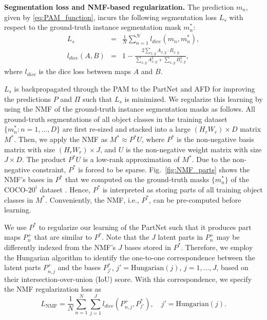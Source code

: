 \documentclass[final]{cvpr}
\begin{document}
{\bf Segmentation loss and NMF-based regularization.}
The prediction $m_n$, given by \eqref{eq:PAM_function}, incurs the following segmentation loss $L_{s}$ with respect to the ground-truth instance segmentation mask $m_n^*$: %
\begin{equation}
\begin{array}{rcl}
    L_{s} &=& \displaystyle \frac{1}{N} \sum_{n=1}^N l_{dice}(m_n, m^*_n),
    \\
    l_{dice}(A,B) &=& 1 - \frac{2 \sum_{x, y}A_{x, y} \cdot B_{x, y}}{\sum_{x, y} A_{x, y}^{2}+\sum_{x, y} B_{x, y}^{2}},
\end{array} 
    \label{eq:mask_loss}
\end{equation}
where $l_{dice}$ is the  dice loss \cite{milletari2016v} between maps $A$ and $B$. 

$L_{s}$ is backpropagated through the PAM to the PartNet and AFD for improving the predictions $P$ and $\Pi$ such that $L_{s}$ is minimized. We regularize this learning by using the NMF of the ground-truth instance segmentation masks as follows.  All ground-truth segmentations of all object classes in the training dataset $\{m_n^*:n=1,\dots,D\}$ are first re-sized and stacked into a large $(H_r W_r) \times D$ matrix $M^*$. Then, we apply the NMF as $M^* \approx P^*U$, where $P^*$ is the non-negative basis matrix with size $(H_r W_r) \times J$, and $U$ is the non-negative weight matrix with size $J \times D$. The product $P^*U$ is a low-rank approximation of $M^*$.
Due to the non-negative constraint, $P^*$ is forced to be sparse. Fig.~\ref{fig:NMF_parts} shows the NMF's bases in $P^*$ that we computed on the ground-truth masks $\{m_n^*\}$ of the COCO-$20^i$ dataset \cite{michaelis2018one}. Hence, $P^*$ is interpreted as storing parts  of all training object classes in $M^*$. Conveniently, the NMF, i.e., $P^*$, can be pre-computed before learning.

We use $P^*$ to regularize our learning of the PartNet such that it produces part maps $P^+_n$ that are similar to $P^*$. Note that the $J$ latent parts in $P^+_n$ may be differently indexed from the NMF's $J$ bases stored in $P^*$. Therefore, we employ the Hungarian algorithm \cite{kuhn1955hungarian} to identify the one-to-one correspondence between the latent parts $P_{n,j}^+$ and the bases $P_{j'}^*$, $j'=\text{Hungarian}(j)$, $j=1,\dots,J$, based on their 
intersection-over-union (IoU) score. With this correspondence, we specify the NMF regularization loss as%
%
%
\begin{equation}
\label{eq:PartLoss}
    L_{\text{NMF}} = \frac{1}{N}\sum_{n=1}^N \sum_{j=1}^J l_{dice}(P_{n,j}^+, P^*_{j'}) ,\quad j'=\text{Hungarian}(j).
\end{equation} 
%
\end{document}
